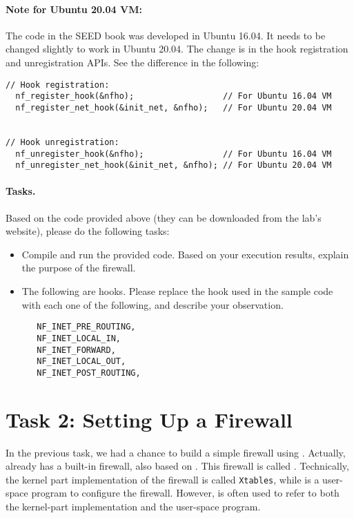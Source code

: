 \paragraph{Note for Ubuntu 20.04 VM:}
The code in the SEED book was developed in Ubuntu 16.04. It needs to be changed slightly 
to work in Ubuntu 20.04. The change is in the hook registration and 
unregistration APIs. See the difference in the following:


\begin{lstlisting}
// Hook registration:
  nf_register_hook(&nfho);                  // For Ubuntu 16.04 VM
  nf_register_net_hook(&init_net, &nfho);   // For Ubuntu 20.04 VM


// Hook unregistration:
  nf_unregister_hook(&nfho);                // For Ubuntu 16.04 VM
  nf_unregister_net_hook(&init_net, &nfho); // For Ubuntu 20.04 VM
\end{lstlisting}
 

\paragraph{Tasks.} Based on the code provided above (they can be downloaded
from the lab's website), please do the following tasks:

\begin{itemize}
\item Compile and run the provided code. Based on your execution results,
explain the purpose of the firewall.  

\item The following are \netfilter hooks. Please replace the 
hook used in the sample code with each one of the following,
and describe your observation.

\begin{lstlisting}
   NF_INET_PRE_ROUTING,
   NF_INET_LOCAL_IN,
   NF_INET_FORWARD,
   NF_INET_LOCAL_OUT,
   NF_INET_POST_ROUTING,
\end{lstlisting}
 
\end{itemize}
 



\section{Task 2: Setting Up a Firewall}

In the previous task, we had a chance to build a simple firewall using \netfilter. Actually,
\linux already has a built-in firewall, also based on \netfilter. This firewall is called
\iptables. Technically, the kernel part implementation of the firewall
is called \texttt{Xtables}, while \iptables is a user-space program to
configure the firewall. However, \iptables is often used to refer to both the kernel-part
implementation and the user-space program. 



